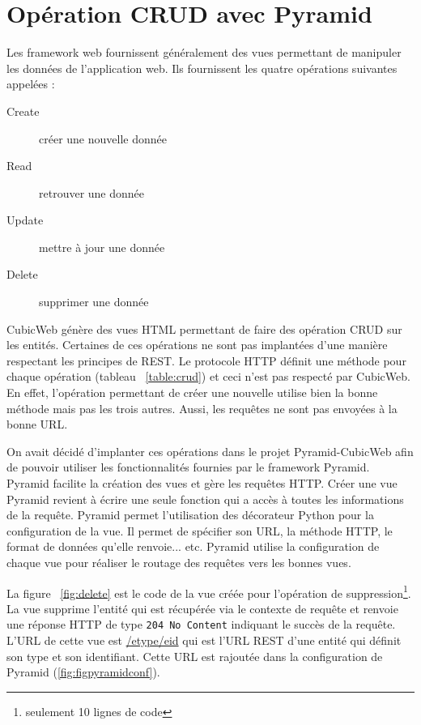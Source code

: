 \section{Opération CRUD avec Pyramid}
Les framework web fournissent généralement des vues permettant de manipuler les données de l'application web. Ils fournissent les quatre opérations suivantes appelées  :
\begin{description}
    \item[Create] créer une nouvelle donnée
    \item[Read] retrouver une donnée
    \item[Update] mettre à jour une donnée
    \item[Delete] supprimer une donnée
\end{description}

CubicWeb génère des vues HTML permettant de faire des opération CRUD sur les entités. Certaines de ces opérations ne sont pas implantées d'une manière respectant les principes de REST. Le protocole HTTP définit une méthode pour chaque opération (tableau ~\ref{table:crud}) et ceci n'est pas respecté par CubicWeb. En effet, l'opération permettant de créer une nouvelle utilise bien la bonne méthode mais pas les trois autres. Aussi, les requêtes ne sont pas envoyées à la bonne URL.

On avait décidé d'implanter ces opérations dans le projet Pyramid-CubicWeb afin de pouvoir utiliser les fonctionnalités fournies par le framework Pyramid. Pyramid facilite la création des vues et gère les requêtes HTTP. Créer une vue Pyramid revient à écrire une seule fonction qui a accès à toutes les informations de la requête. Pyramid permet l'utilisation des décorateur Python pour la configuration de la vue. Il permet de spécifier son URL, la méthode HTTP, le format de données qu'elle renvoie... etc. Pyramid utilise la configuration de chaque vue pour réaliser le routage des requêtes vers les bonnes vues. 

La figure ~\ref{fig:delete} est le code de la vue créée pour l'opération de suppression\footnote{seulement 10 lignes de code}. La vue supprime l'entité qui est récupérée via le contexte de requête et renvoie une réponse HTTP de type \texttt{204~No~Content} indiquant le succès de la requête. L'URL de cette vue est \url{/etype/eid} qui est l'URL REST d'une entité qui définit son type et son identifiant. Cette URL est rajoutée dans la configuration de Pyramid (\ref{fig:figpyramidconf}).

